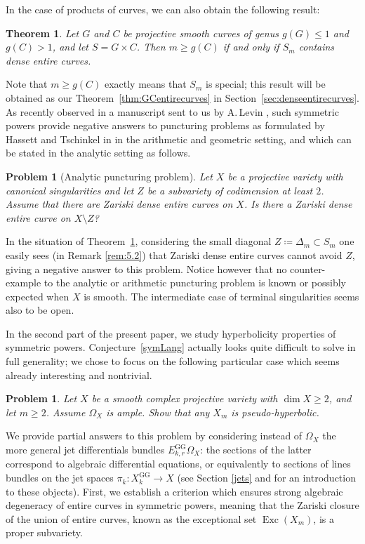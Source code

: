 \documentclass[JEP,XML,SOM,Unicode, NoEqCountersInSection,NoFloatCountersInSection,published]{cedram}
\newcommand{\rGG}{\mathrm{GG}}
\DeclareMathOperator{\Exc}{Exc}
\theoremstyle{theorem}
\newtheorem{theorem}{Theorem}
\newtheorem{problem}[proposition]{Problem}
\theoremstyle{definition}
\begin{document}
In the case of products of curves, we can also obtain the following result:

\begin{theorem}\label{prod}
Let $G$ and $C$ be projective smooth curves of genus $g(G)\leq 1$ and $g(C)>1$, and let $S=G\times C$.
Then $m\geq g(C)$ if and only if $S_m$ contains dense entire curves.
\end{theorem}

Note that $m\geq g(C)$ exactly means that $S_m$ is special; this result will be obtained as our Theorem~\ref{thm:GCentirecurves} in Section~\ref{sec:denseentirecurves}. As recently observed in a manuscript sent to us by A.\,Levin \cite{L}, such symmetric powers provide negative answers to puncturing problems as formulated by Hassett and Tschinkel in \cite{HT} in the arithmetic and geometric setting, and which can be stated in the analytic setting as follows.

\begin{problem}[Analytic puncturing problem]
Let $X$ be a projective variety with canonical singularities and let $Z$ be a subvariety of codimension at least $2$. Assume that there are Zariski dense entire curves on $X$. Is there a Zariski dense entire curve on $X \setminus Z$?
\end{problem}

In the situation of Theorem~\ref{prod}, considering the small diagonal $Z\coloneqq \Delta_m \subset S_m$ one easily sees (in Remark \ref{rem:5.2}) that Zariski dense entire curves cannot avoid $Z$, giving a negative answer to this problem. Notice however that no counter-example to the analytic or arithmetic puncturing problem is known or possibly expected when $X$ is smooth. The intermediate case of terminal singularities seems also to be open.\enlargethispage{.5\baselineskip}%

In the second part of the present paper, we study hyperbolicity properties of symmetric powers. Conjecture~\ref{symLang} actually looks quite difficult to solve in full generality; we chose to focus on the following particular case which seems already interesting and nontrivial.

\begin{problem} \label{prob:Omegaample}
Let $X$ be a smooth complex projective variety with $\dim X \geq 2$, and let \(m \geq 2\). Assume $\Omega_X$ is ample. Show that any $X_m$ is pseudo-hyperbolic.
\end{problem}

We provide partial answers to this problem by considering instead of \(\Omega_{X}\) the more general jet differentials bundles $E_{k,r}^{\rGG} \Omega_X$: the sections of the latter correspond to algebraic differential equations, or equivalently to sections of lines bundles on the jet spaces $\pi_k: X_k^{\rGG} \to X$ (see Section \ref{jets} and \cite{Dem95} for an introduction to these objects). First, we establish a criterion which ensures strong algebraic degeneracy of entire curves in symmetric powers, meaning that the Zariski closure of the union of entire curves, known as the exceptional set $\Exc(X_m)$, is a proper subvariety.
\end{document}
